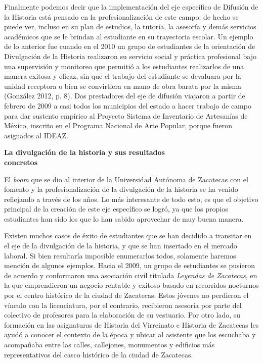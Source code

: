 \bigskip
Finalmente podemos decir que la implementación del eje específico de Difusión de
la Historia está pensado en la profesionalización de este campo; de hecho se
puede ver, incluso en su plan de estudios, la tutoría, la asesoría y demás
servicios académicos que se le brindan al estudiante en su trayectoria escolar.
Un ejemplo de lo anterior fue cuando en el 2010 un grupo de estudiantes de la
orientación de Divulgación de la Historia realizaron su servicio social y
práctica profesional bajo una supervisión y monitoreo que permitió a los
estudiantes realizarlos de una manera exitosa y eficaz, sin que el trabajo del
estudiante se devaluara por la unidad receptora o bien se convirtiera en mano
de obra barata por la misma (González 2012, p. 8). Dos prestadores del eje 
de difusión viajaron a partir de febrero de
2009 a casi todos los municipios del estado a hacer trabajo de campo para dar
sustento empírico al Proyecto Sistema de Inventario de Artesanías de México,
inscrito en el Programa Nacional de Arte Popular, porque fueron asignados al IDEAZ\@.


\bigskip
\textbf{La divulgación de la historia y sus resultados\\ concretos}

El \textit{boom} que se dio al interior de la Universidad Autónoma de Zacatecas
con el fomento y la profesionalización de la divulgación de la historia se ha
venido reflejando a través de los años. Lo más interesante de todo esto, es que
el objetivo principal de la creación de este eje específico se logró, ya que los
propios estudiantes han sido los que lo han sabido aprovechar de muy buena
manera. 

Existen muchos casos de éxito de estudiantes que se han decidido a transitar
en el eje de la divulgación de la historia, y que se han insertado en el mercado
laboral. Si bien resultaría imposible enumerarlos todos, solamente haremos mención
de algunos ejemplos. Hacia el 2009, un grupo de estudiantes se pusieron de
acuerdo y conformaron una asociación civil titulada \textit{Leyendas de
Zacatecas}, en la que emprendieron un negocio rentable y exitoso basado en
recorridos nocturnos por el centro histórico de la ciudad de Zacatecas. Estos
jóvenes no perdieron el vínculo con la licenciatura, por el contrario, 
recibieron asesoría por parte del colectivo de profesores para la elaboración
de su vestuario. Por otro lado, su formación en las asignaturas de Historia del
Virreinato e Historia de Zacatecas les ayudó a conocer el contexto de la
época y ubicar al asistente que los escuchaba y acompañaba entre las calles,
callejones, monumentos y edificios más representativos del casco histórico de
la ciudad de Zacatecas.

